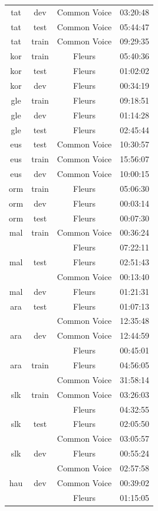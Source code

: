 \begin{longtable}{cccc}
tat & dev & Common Voice & 03:20:48 \\ 
tat & test & Common Voice & 05:44:47 \\ 
tat & train & Common Voice & 09:29:35 \\ \midrule
kor & train & Fleurs & 05:40:36 \\ 
kor & test & Fleurs & 01:02:02 \\ 
kor & dev & Fleurs & 00:34:19 \\ \midrule
gle & train & Fleurs & 09:18:51 \\ 
gle & dev & Fleurs & 01:14:28 \\ 
gle & test & Fleurs & 02:45:44 \\ \midrule
eus & test & Common Voice & 10:30:57 \\ 
eus & train & Common Voice & 15:56:07 \\ 
eus & dev & Common Voice & 10:00:15 \\ \midrule
orm & train & Fleurs & 05:06:30 \\ 
orm & dev & Fleurs & 00:03:14 \\ 
orm & test & Fleurs & 00:07:30 \\ \midrule
mal & train & Common Voice & 00:36:24 \\ 
 & & Fleurs & 07:22:11 \\ 
mal & test & Fleurs & 02:51:43 \\ 
 & & Common Voice & 00:13:40 \\ 
mal & dev & Fleurs & 01:21:31 \\ \midrule
ara & test & Fleurs & 01:07:13 \\ 
 & & Common Voice & 12:35:48 \\ 
ara & dev & Common Voice & 12:44:59 \\ 
 & & Fleurs & 00:45:01 \\ 
ara & train & Fleurs & 04:56:05 \\ 
 & & Common Voice & 31:58:14 \\ \midrule
slk & train & Common Voice & 03:26:03 \\ 
 & & Fleurs & 04:32:55 \\ 
slk & test & Fleurs & 02:05:50 \\ 
 & & Common Voice & 03:05:57 \\ 
slk & dev & Fleurs & 00:55:24 \\ 
 & & Common Voice & 02:57:58 \\ \midrule
hau & dev & Common Voice & 00:39:02 \\ 
 & & Fleurs & 01:15:05 \\ 

\end{longtable}
